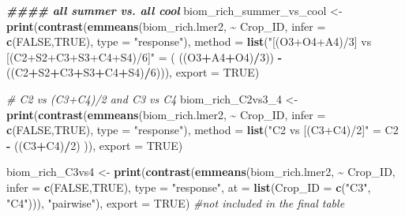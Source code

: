 \documentclass[
]{article}
\newenvironment{Shaded}{\begin{snugshade}}{\end{snugshade}}
\newcommand{\AttributeTok}[1]{\textcolor[rgb]{0.13,0.29,0.53}{#1}}
\newcommand{\CommentTok}[1]{\textcolor[rgb]{0.56,0.35,0.01}{\textit{#1}}}
\newcommand{\ConstantTok}[1]{\textcolor[rgb]{0.56,0.35,0.01}{#1}}
\newcommand{\DecValTok}[1]{\textcolor[rgb]{0.00,0.00,0.81}{#1}}
\newcommand{\DocumentationTok}[1]{\textcolor[rgb]{0.56,0.35,0.01}{\textbf{\textit{#1}}}}
\newcommand{\FunctionTok}[1]{\textcolor[rgb]{0.13,0.29,0.53}{\textbf{#1}}}
\newcommand{\NormalTok}[1]{#1}
\newcommand{\OtherTok}[1]{\textcolor[rgb]{0.56,0.35,0.01}{#1}}
\newcommand{\SpecialCharTok}[1]{\textcolor[rgb]{0.81,0.36,0.00}{\textbf{#1}}}
\newcommand{\StringTok}[1]{\textcolor[rgb]{0.31,0.60,0.02}{#1}}
\begin{document}
\begin{Shaded}
\begin{Highlighting}[]
\DocumentationTok{\#\#\#\# all summer vs. all cool}
\NormalTok{biom\_rich\_summer\_vs\_cool }\OtherTok{\textless{}{-}} \FunctionTok{print}\NormalTok{(}\FunctionTok{contrast}\NormalTok{(}\FunctionTok{emmeans}\NormalTok{(biom\_rich.lmer2, }\SpecialCharTok{\textasciitilde{}}\NormalTok{ Crop\_ID,}
                                                   \AttributeTok{infer =} \FunctionTok{c}\NormalTok{(}\ConstantTok{FALSE}\NormalTok{,}\ConstantTok{TRUE}\NormalTok{), }
                                                   \AttributeTok{type =} \StringTok{"response"}\NormalTok{),}
                                           \AttributeTok{method =} \FunctionTok{list}\NormalTok{(}\StringTok{"[(O3+O4+A4)/3] vs [(C2+S2+C3+S3+C4+S4)/6]"} \OtherTok{=} 
\NormalTok{                                                           ( ((O3}\SpecialCharTok{+}\NormalTok{A4}\SpecialCharTok{+}\NormalTok{O4)}\SpecialCharTok{/}\DecValTok{3}\NormalTok{)) }\SpecialCharTok{{-}}\NormalTok{ ((C2}\SpecialCharTok{+}\NormalTok{S2}\SpecialCharTok{+}\NormalTok{C3}\SpecialCharTok{+}\NormalTok{S3}\SpecialCharTok{+}\NormalTok{C4}\SpecialCharTok{+}\NormalTok{S4)}\SpecialCharTok{/}\DecValTok{6}\NormalTok{))),}
                                  \AttributeTok{export =} \ConstantTok{TRUE}\NormalTok{)}

\CommentTok{\# C2 vs (C3+C4)/2 and C3 vs C4}
\NormalTok{biom\_rich\_C2vs3\_4 }\OtherTok{\textless{}{-}} \FunctionTok{print}\NormalTok{(}\FunctionTok{contrast}\NormalTok{(}\FunctionTok{emmeans}\NormalTok{(biom\_rich.lmer2, }\SpecialCharTok{\textasciitilde{}}\NormalTok{ Crop\_ID,}
                                            \AttributeTok{infer =} \FunctionTok{c}\NormalTok{(}\ConstantTok{FALSE}\NormalTok{,}\ConstantTok{TRUE}\NormalTok{), }
                                            \AttributeTok{type =} \StringTok{"response"}\NormalTok{), }
                                    \AttributeTok{method =} \FunctionTok{list}\NormalTok{(}\StringTok{"C2 vs [(C3+C4)/2]"} \OtherTok{=}\NormalTok{ C2 }\SpecialCharTok{{-}}\NormalTok{ ((C3}\SpecialCharTok{+}\NormalTok{C4)}\SpecialCharTok{/}\DecValTok{2}\NormalTok{) )),}
                           \AttributeTok{export =} \ConstantTok{TRUE}\NormalTok{)}

\NormalTok{biom\_rich\_C3vs4 }\OtherTok{\textless{}{-}} \FunctionTok{print}\NormalTok{(}\FunctionTok{contrast}\NormalTok{(}\FunctionTok{emmeans}\NormalTok{(biom\_rich.lmer2, }\SpecialCharTok{\textasciitilde{}}\NormalTok{ Crop\_ID, }
                                          \AttributeTok{infer =} \FunctionTok{c}\NormalTok{(}\ConstantTok{FALSE}\NormalTok{,}\ConstantTok{TRUE}\NormalTok{),}
                                          \AttributeTok{type =} \StringTok{"response"}\NormalTok{,}
                                          \AttributeTok{at =} \FunctionTok{list}\NormalTok{(}\AttributeTok{Crop\_ID =} \FunctionTok{c}\NormalTok{(}\StringTok{"C3"}\NormalTok{, }\StringTok{"C4"}\NormalTok{))), }\StringTok{"pairwise"}\NormalTok{), }
                         \AttributeTok{export =} \ConstantTok{TRUE}\NormalTok{) }\CommentTok{\#not included in the final table}


\end{Highlighting}
\end{Shaded}
\end{document}
